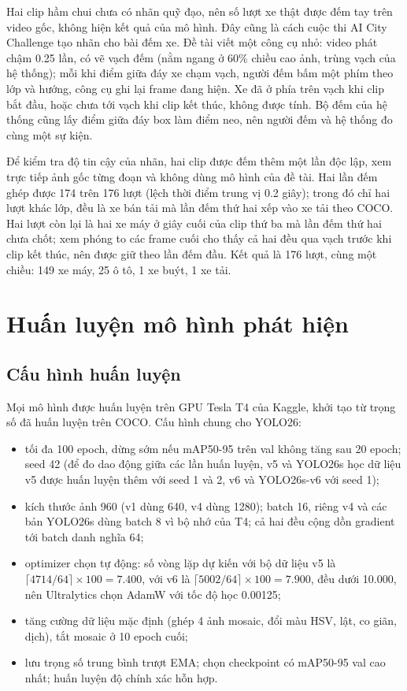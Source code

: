 Hai clip hầm chui chưa có nhãn quỹ đạo, nên số lượt xe thật được đếm tay trên video gốc, không hiện kết quả của mô hình.
Đây cũng là cách cuộc thi AI City Challenge tạo nhãn cho bài đếm xe. Đề tài viết một công cụ nhỏ: video phát chậm
0.25 lần, có vẽ vạch đếm (nằm ngang ở 60\% chiều cao ảnh, trùng vạch của hệ thống); mỗi khi điểm giữa đáy xe chạm vạch,
người đếm bấm một phím theo lớp và hướng, công cụ ghi lại frame đang hiện. Xe đã ở phía trên vạch khi clip bắt đầu, hoặc
chưa tới vạch khi clip kết thúc, không được tính. Bộ đếm của hệ thống cũng lấy điểm giữa đáy box làm điểm neo, nên
người đếm và hệ thống đo cùng một sự kiện.

Để kiểm tra độ tin cậy của nhãn, hai clip được đếm thêm một lần độc lập, xem trực tiếp ảnh gốc từng đoạn và không dùng
mô hình của đề tài. Hai lần đếm ghép được 174 trên 176 lượt (lệch thời điểm trung vị 0.2 giây); trong đó chỉ hai lượt
khác lớp, đều là xe bán tải mà lần đếm thứ hai xếp vào xe tải theo COCO. Hai lượt còn lại là hai xe máy ở giây cuối của
clip thứ ba mà lần đếm thứ hai chưa chốt; xem phóng to các frame cuối cho thấy cả hai đều qua vạch trước khi clip kết
thúc, nên được giữ theo lần đếm đầu. Kết quả là 176 lượt, cùng một chiều: 149 xe máy, 25 ô tô, 1 xe buýt, 1 xe tải.

\section{Huấn luyện mô hình phát hiện}

\subsection{Cấu hình huấn luyện}
\label{sec:cau-hinh-train}

Mọi mô hình được huấn luyện trên GPU Tesla T4 của Kaggle, khởi tạo từ trọng số đã huấn luyện trên COCO. Cấu hình chung
cho YOLO26:
\begin{itemize}
  \item tối đa 100 epoch, dừng sớm nếu mAP50-95 trên val không tăng sau 20 epoch; seed 42 (để đo dao động giữa các lần
        huấn luyện, v5 và YOLO26s học dữ liệu v5 được huấn luyện thêm với seed 1 và 2, v6 và YOLO26s-v6 với seed 1);
  \item kích thước ảnh 960 (v1 dùng 640, v4 dùng 1280); batch 16, riêng v4 và các bản YOLO26s dùng batch 8 vì bộ nhớ của
        T4; cả hai đều cộng dồn gradient tới batch danh nghĩa 64;
  \item optimizer chọn tự động: số vòng lặp dự kiến với bộ dữ liệu v5 là $\lceil 4714 / 64 \rceil \times 100 = 7.400$,
        với v6 là $\lceil 5002 / 64 \rceil \times 100 = 7.900$, đều dưới 10.000, nên Ultralytics chọn AdamW với tốc độ
        học 0.00125;
  \item tăng cường dữ liệu mặc định (ghép 4 ảnh mosaic, đổi màu HSV, lật, co giãn, dịch), tắt mosaic ở 10 epoch cuối;
  \item lưu trọng số trung bình trượt EMA; chọn checkpoint có mAP50-95 val cao nhất; huấn luyện độ chính xác hỗn hợp.
\end{itemize}

